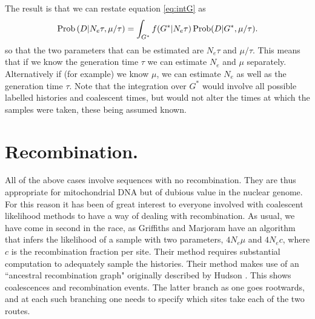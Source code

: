 The result is that we can restate equation \ref{eq:intG} as 
\begin{equation} %
\Prob\left(D|N_e\tau, \mu/\tau\right) = \int_{G^*} f(G^*|N_e\tau) \Prob(D|G^*, \mu/\tau).
\end{equation}
so that the two parameters that can be estimated are $N_e\tau$ and $\mu/\tau$.
This means that if we know the generation time $\tau$ we can estimate
$N_e$ and $\mu$ separately.  Alternatively if (for example) we know $\mu$,
we can estimate $N_e$ as well as the generation time $\tau$.  Note that the
integration over $G^*$ would involve all possible labelled histories and
coalescent times, but would not alter the times at which the samples were
taken, these being assumed known.

\section{Recombination.}  All of the above cases involve sequences with
no recombination.  They are thus appropriate for mitochondrial DNA but
of dubious value in the nuclear genome.  For this reason it has been of
great interest to everyone involved with coalescent likelihood methods to
have a way of dealing with recombination.  As usual, we have come in
second in the race, as Griffiths and Marjoram \cite{GM96} have an
algorithm
that infers the likelihood of a sample with two parameters, $4N_e\mu$
and $4N_ec$, where $c$ is the recombination fraction per site.  Their
method requires substantial computation to adequately sample the histories.
Their method makes use of an ``ancestral recombination graph" \cite{GM97}
originally described by Hudson \cite{Hudson90}.  This shows coalescences and recombination
events.  The latter branch as one goes rootwards, and at each such branching
one needs to specify which sites take each of the two routes.


